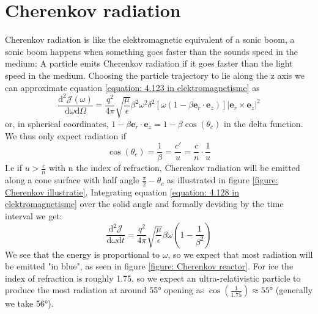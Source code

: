 \documentclass[11pt,a4paper,faculty=we,language=en,doctype=report]{cls/ugent-doc}
\begin{document}
\section{Cherenkov radiation}
Cherenkov radiation is like the elektromagnetic equivalent of a sonic boom, a sonic boom happens when something goes faster than the sounds speed in the medium; A particle emits Cherenkov radiation if it goes faster than the light speed in the medium. Choosing the particle trajectory to lie along the z axis we can approximate equation \ref{equation: 4.123 in elektromagnetisme} as
\begin{equation}
	\frac{\text{d}^2 \mathscr{J}(\omega)}{\text{d} \omega \text{d} \Omega} = \frac{q^2}{4\pi}\sqrt{\frac{\mu}{\epsilon}}\beta^2\omega^2\delta^2[\omega(1-\beta \mathbf{e}_r\cdot\mathbf{e}_z)]|\mathbf{e}_r\times\mathbf{e}_z|^2 \label{equation: 4.128 in elektromagnetisme}
\end{equation}
or, in spherical coordinates, $1-\beta \mathbf{e}_r\cdot\mathbf{e}_z = 1-\beta\cos(\theta_c)$ in the delta function. We thus only expect radiation if
\begin{equation}
\cos(\theta_c) = \frac{1}{\beta} = \frac{c'}{u} = \frac{c}{n}\cdot\frac{1}{u}
\end{equation}
I.e if $u>\frac{c}{n}$ with n the index of refraction, Cherenkov radiation will be emitted along a cone surface with half angle $\frac{\pi}{2}-\theta_c$ as illustrated in figure \ref{figure: Cherenkov illustratie}. Integrating equation \ref{equation: 4.128 in elektromagnetisme} over the solid angle and formally deviding by the time interval we get:
\begin{equation}
	\frac{\text{d}^2\mathscr{J}}{\text{d}\omega \text{d}t} = \frac{q^2}{4\pi}\sqrt{\frac{\mu}{\epsilon}}\beta\omega\left(1-\frac{1}{\beta^2}\right)	
\end{equation}
We see that the energy is proportional to $\omega$, so we expect that most radiation will be emitted "in blue", as seen in figure \ref{figure: Cherenkov reactor}.
For ice the index of refraction is roughly 1.75, so we expect an ultra-relativistic particle to produce the most radiation at around 55° opening as $\cos\left(\frac{1}{1.75}\right)\approx 55$° (generally we take 56°).
\end{document}

